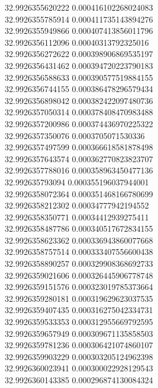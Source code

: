 {32.9926355620222	0.000416102268024083\\
32.9926355785914	0.000411735143894276\\
32.9926355949866	0.000407413856011796\\
32.9926356112096	0.00040313792325016\\
32.9926356272622	0.000398906869535197\\
32.9926356431462	0.000394720223790183\\
32.9926356588633	0.000390577519884155\\
32.9926356744155	0.000386478296579434\\
32.9926356898042	0.000382422097480736\\
32.9926357050314	0.000378408470983488\\
32.9926357200986	0.000374436970225322\\
32.9926357350076	0.0003705071530336\\
32.9926357497599	0.000366618581878498\\
32.9926357643574	0.000362770823823707\\
32.9926357788016	0.000358963450477136\\
32.992635793094	0.000355196037944001\\
32.9926358072364	0.000351468166780699\\
32.9926358212302	0.00034777942194552\\
32.9926358350771	0.00034412939275411\\
32.9926358487786	0.000340517672834155\\
32.9926358623362	0.000336943860077668\\
32.9926358757514	0.000333407556600438\\
32.9926358890257	0.000329908368692733\\
32.9926359021606	0.000326445906778748\\
32.9926359151576	0.000323019785373664\\
32.9926359280181	0.000319629623037535\\
32.9926359407435	0.000316275042334731\\
32.9926359533353	0.000312955669792595\\
32.9926359657949	0.000309671135858503\\
32.9926359781236	0.000306421074860107\\
32.9926359903229	0.000303205124962398\\
32.9926360023941	0.000300022928129543\\
32.9926360143385	0.000296874130084324\\
}

